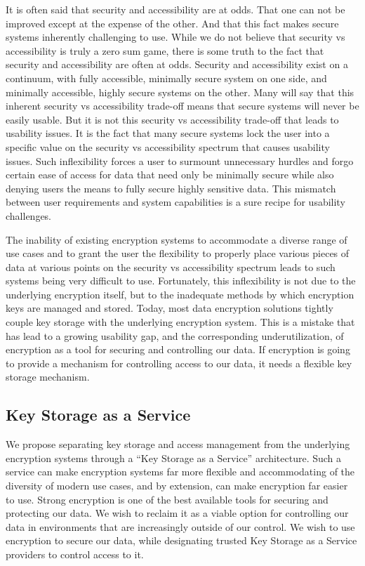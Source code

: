 It is often said that security and accessibility are at odds. That one
can not be improved except at the expense of the other. And that this
fact makes secure systems inherently challenging to use. While we do
not believe that security vs accessibility is truly a zero sum game,
there is some truth to the fact that security and accessibility are
often at odds. Security and accessibility exist on a continuum, with
fully accessible, minimally secure system on one side, and minimally
accessible, highly secure systems on the other. Many will say that
this inherent security vs accessibility trade-off means that secure
systems will never be easily usable. But it is not this security vs
accessibility trade-off that leads to usability issues. It is the fact
that many secure systems lock the user into a specific value on the
security vs accessibility spectrum that causes usability issues. Such
inflexibility forces a user to surmount unnecessary hurdles and forgo
certain ease of access for data that need only be minimally secure
while also denying users the means to fully secure highly sensitive
data. This mismatch between user requirements and system capabilities
is a sure recipe for usability challenges.

The inability of existing encryption systems to accommodate a diverse
range of use cases and to grant the user the flexibility to properly
place various pieces of data at various points on the security vs
accessibility spectrum leads to such systems being very difficult to
use. Fortunately, this inflexibility is not due to the underlying
encryption itself, but to the inadequate methods by which encryption
keys are managed and stored. Today, most data encryption solutions
tightly couple key storage with the underlying encryption system. This
is a mistake that has lead to a growing usability gap, and the
corresponding underutilization, of encryption as a tool for securing
and controlling our data. If encryption is going to provide a
mechanism for controlling access to our data, it needs a flexible key
storage mechanism.

\subsection{Key Storage as a Service}

We propose separating key storage and access management from the
underlying encryption systems through a ``Key Storage as a Service''
architecture. Such a service can make encryption systems far more
flexible and accommodating of the diversity of modern use cases, and
by extension, can make encryption far easier to use. Strong encryption
is one of the best available tools for securing and protecting our
data. We wish to reclaim it as a viable option for controlling our
data in environments that are increasingly outside of our control. We
wish to use encryption to secure our data, while designating trusted
Key Storage as a Service providers to control access to it.

